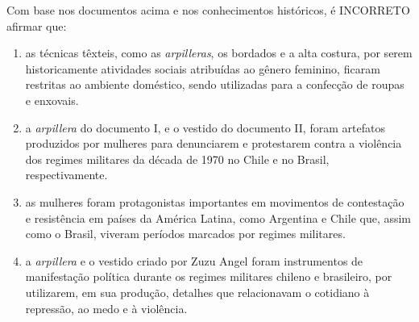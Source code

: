 Com base nos documentos acima e nos conhecimentos históricos, é INCORRETO afirmar que:\begin{enumerate}
\item as técnicas têxteis, como as \textit{arpilleras}, os bordados e a alta costura, por serem historicamente atividades sociais atribuídas ao gênero feminino, ficaram restritas ao ambiente doméstico, sendo utilizadas para a confecção de roupas e enxovais.
\item a \textit{arpillera} do documento I, e o vestido do documento II, foram artefatos produzidos por mulheres para denunciarem e protestarem contra a violência dos regimes militares da década de 1970 no Chile e no Brasil, respectivamente.
\item as mulheres foram protagonistas importantes em movimentos de contestação e resistência em países da América Latina, como Argentina e Chile que, assim como o Brasil, viveram períodos marcados por regimes militares.
\item a \textit{arpillera} e o vestido criado por Zuzu Angel foram instrumentos de manifestação política durante os regimes militares chileno e brasileiro, por utilizarem, em sua produção, detalhes que relacionavam o cotidiano à repressão, ao medo e à violência.\end{enumerate}
